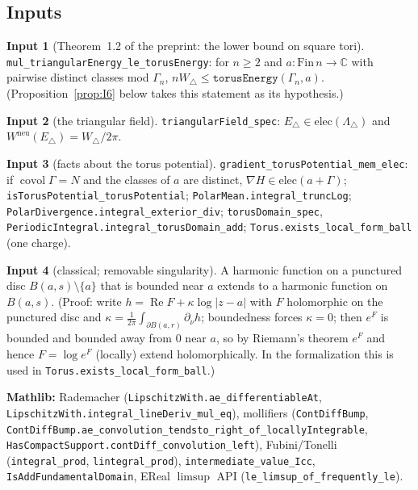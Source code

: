\documentclass[11pt]{article}
\theoremstyle{definition}
\newtheorem{inpt}{Input}
\theoremstyle{remark}
\newcommand{\C}{\mathbb C}
\newcommand{\Wneu}{W^{\mathrm{neu}}}
\begin{document}
\subsection{Inputs}\label{sec:inputs}
\begin{inpt}[Theorem~1.2 of the preprint: the lower bound on square tori]\label{in:R1}
\texttt{mul\_triangularEnergy\_le\_torusEnergy}:
for $n\ge2$ and $a:\mathrm{Fin}\,n\to\C$ with pairwise distinct classes mod $\Gamma_n$,
$nW_\triangle\le\texttt{torusEnergy}(\Gamma_n,a)$.  (Proposition~\ref{prop:I6} below takes this
statement as its hypothesis.)
\end{inpt}
\begin{inpt}[the triangular field]\label{in:Etri}
\texttt{triangularField\_spec}: $E_\triangle\in\mathrm{elec}(\Lambda_\triangle)$ and $\Wneu(E_\triangle)=W_\triangle/2\pi$.
\end{inpt}
\begin{inpt}[facts about the torus potential]\label{in:main}
\texttt{gradient\_torusPotential\_mem\_elec}: if $\operatorname{covol}\Gamma=N$ and the
classes of $a$ are distinct, $\nabla H\in\mathrm{elec}(a+\Gamma)$; \texttt{isTorusPotential\_torusPotential};
\texttt{PolarMean.integral\_truncLog}; \texttt{PolarDivergence.integral\_exterior\_div}; \texttt{torusDomain\_spec},
\texttt{PeriodicIntegral.integral\_torusDomain\_add}; \texttt{Torus.exists\_local\_form\_ball} (one charge).
\end{inpt}
\begin{inpt}[classical; removable singularity]\label{in:removable}
A harmonic function on a punctured disc $B(a,s)\setminus\{a\}$ that is bounded near $a$ extends to a harmonic function on
$B(a,s)$. (Proof: write $h=\operatorname{Re}F+\kappa\log|z-a|$ with $F$ holomorphic on the punctured disc and
$\kappa=\frac1{2\pi}\int_{\partial B(a,r)}\partial_\nu h$; boundedness forces $\kappa=0$; then $e^{F}$ is bounded and bounded away from $0$
near $a$, so by Riemann's theorem $e^F$ and hence $F=\log e^F$ (locally) extend holomorphically. In the formalization this is
used in \texttt{Torus.exists\_local\_form\_ball}.)
\end{inpt}
\textbf{Mathlib:} Rademacher (\texttt{LipschitzWith.ae\_differentiableAt},
\texttt{LipschitzWith.integral\_lineDeriv\_mul\_eq}), mollifiers (\texttt{ContDiffBump},
\texttt{ContDiffBump.ae\_convolution\_tendsto\_right\_of\_locallyIntegrable}, \texttt{HasCompactSupport.contDiff\_convolution\_left}),
Fubini/Tonelli (\texttt{integral\_prod}, \texttt{lintegral\_prod}), \texttt{intermediate\_value\_Icc},
\texttt{IsAddFundamentalDomain}, EReal $\limsup$ API (\texttt{le\_limsup\_of\_frequently\_le}).
\end{document}
